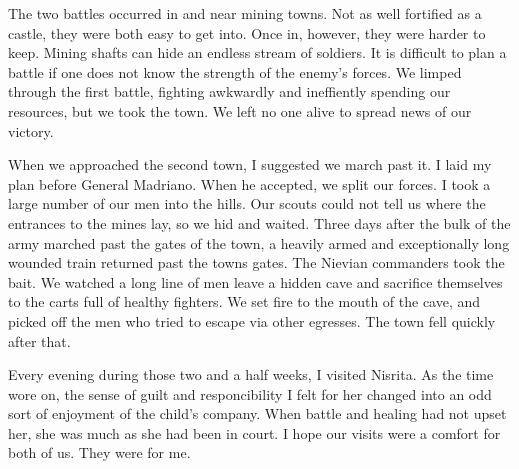 \documentclass{article}
\begin{document}
The two battles occurred in and near mining towns. Not as well fortified as a castle, they were both easy to get into. Once in, however, they were harder to keep. Mining shafts can hide an endless stream of soldiers. It is difficult to plan a battle if one does not know the strength of the enemy's forces. We limped through the first battle, fighting awkwardly and ineffiently spending our resources, but we took the town. We left no one alive to spread news of our victory. 

When we approached the second town, I suggested we march past it. I laid my plan before General Madriano. When he accepted, we split our forces. I took a large number of our men into the hills. Our scouts could not tell us where the entrances to the mines lay, so we hid and waited. Three days after the bulk of the army marched past the gates of the town, a heavily armed and exceptionally long wounded train returned past the towns gates. The Nievian commanders took the bait. We watched a long line of men leave a hidden cave and sacrifice themselves to the carts full of healthy fighters. We set fire to the mouth of the cave, and picked off the men who tried to escape via other egresses. The town fell quickly after that.

Every evening during those two and a half weeks, I visited Nisrita. As the time wore on, the sense of guilt and responcibility I felt for her changed into an odd sort of enjoyment of the child's company. When battle and healing had not upset her, she was much as she had been in court. I hope our visits were a comfort for both of us. They were for me. 
\end{document}
